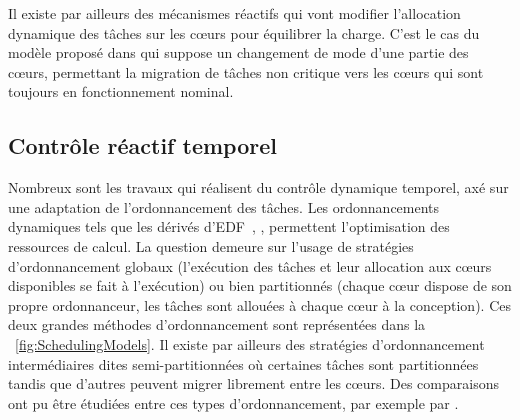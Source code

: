 \documentclass[french, a4paper, 11pt, twoside, pdftex]{StyleThese}
\begin{document}
 	Il existe par ailleurs des mécanismes réactifs qui vont modifier l'allocation dynamique des tâches sur les cœurs pour équilibrer la charge. C'est le cas du modèle proposé dans \cite{xu_semi-partitioned_2019} qui suppose un changement de mode d'une partie des cœurs, permettant la migration de tâches non critique vers les cœurs qui sont toujours en fonctionnement nominal.
    
    \subsection{Contrôle réactif temporel}
    Nombreux sont les travaux qui réalisent du contrôle dynamique temporel, axé sur une adaptation de l'ordonnancement des tâches. Les ordonnancements dynamiques tels que les dérivés d'EDF~\cite{lelli_efficient_2011}, \cite{behera_schedulability_2012}, \cite{rodriguez_multicriteria_2013} permettent l'optimisation des ressources de calcul. La question demeure sur l'usage de stratégies d'ordonnancement globaux (l'exécution des tâches et leur allocation aux cœurs disponibles se fait à l'exécution) ou bien partitionnés (chaque cœur dispose de son propre ordonnanceur, les tâches sont allouées à chaque cœur à la conception). Ces deux grandes méthodes d'ordonnancement sont représentées dans la ~\autoref{fig:SchedulingModels}. Il existe par ailleurs des stratégies d'ordonnancement intermédiaires dites semi-partitionnées où certaines tâches sont partitionnées tandis que d'autres peuvent migrer librement entre les cœurs. Des comparaisons ont pu être étudiées entre ces types d'ordonnancement, par exemple par \cite{li_analysis_2014}. 
\end{document}
